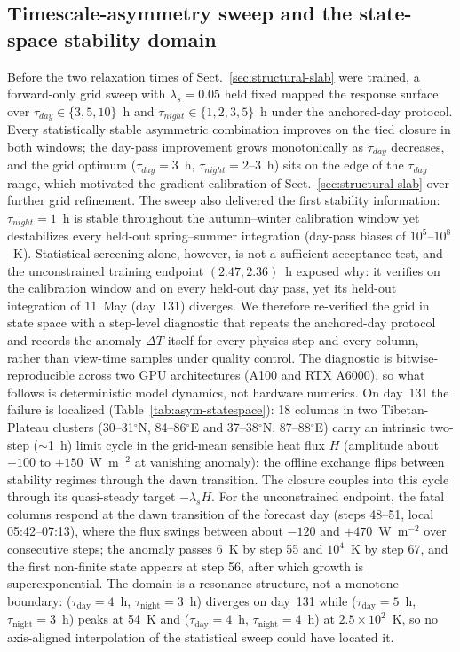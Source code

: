 \subsection{Timescale-asymmetry sweep and the state-space stability domain}
\label{sec:asym-sweep}

Before the two relaxation times of Sect.~\ref{sec:structural-slab} were
trained, a forward-only grid sweep with $\lambda_s = 0.05$ held fixed
mapped the response surface over $\tau_{day} \in \{3,5,10\}$~h and
$\tau_{night} \in \{1,2,3,5\}$~h under the anchored-day protocol. Every
statistically stable asymmetric combination improves on the tied closure in
both windows; the day-pass improvement grows monotonically as $\tau_{day}$
decreases, and the grid optimum ($\tau_{day} = 3$~h, $\tau_{night} =
2$--$3$~h) sits on the edge of the $\tau_{day}$ range, which motivated the
gradient calibration of Sect.~\ref{sec:structural-slab} over further grid
refinement. The sweep also delivered the first stability information:
$\tau_{night} = 1$~h is stable throughout the autumn--winter calibration
window yet destabilizes every held-out spring--summer integration
(day-pass biases of $10^{5}$--$10^{8}$~K). Statistical screening alone,
however, is not a sufficient acceptance test, and the unconstrained
training endpoint $(2.47, 2.36)$~h exposed why: it verifies on the
calibration window and on every held-out day pass, yet its held-out
integration of 11~May (day~131) diverges. We therefore re-verified the grid
in state space with a
step-level diagnostic that repeats the anchored-day protocol and records
the anomaly $\Delta T$ itself for every physics step and every column,
rather than view-time samples under quality control. The diagnostic is
bitwise-reproducible across two GPU architectures (A100 and RTX A6000), so
what follows is deterministic model dynamics, not hardware numerics. On
day~131 the failure is localized (Table~\ref{tab:asym-statespace}): 18
columns in two Tibetan-Plateau clusters (30--31$^\circ$N,
84--86$^\circ$E and 37--38$^\circ$N, 87--88$^\circ$E)
carry an intrinsic two-step ($\sim$1~h) limit cycle in the grid-mean
sensible heat flux $H$ (amplitude about $-100$ to $+150$~W~m$^{-2}$ at
vanishing anomaly): the offline exchange flips between stability regimes
through the dawn transition. The closure couples into this cycle through
its quasi-steady target $-\lambda_s H$. For the unconstrained endpoint, the
fatal columns respond at the dawn transition of the forecast day (steps
48--51, local 05:42--07:13), where the flux swings between about $-120$
and $+470$~W~m$^{-2}$ over consecutive steps; the anomaly passes 6~K by
step 55 and $10^{4}$~K by step 67, and the first non-finite state appears
at step 56, after which growth is superexponential. The domain is a
resonance structure, not a monotone boundary: ($\tau_{\mathrm{day}} = 4$~h,
$\tau_{\mathrm{night}} = 3$~h) diverges on day~131 while ($\tau_{\mathrm{day}}
= 5$~h, $\tau_{\mathrm{night}} = 3$~h) peaks at 54~K and
($\tau_{\mathrm{day}} = 4$~h, $\tau_{\mathrm{night}} = 4$~h) at
$2.5\times10^{2}$~K, so no axis-aligned interpolation of the statistical
sweep could have located it.

